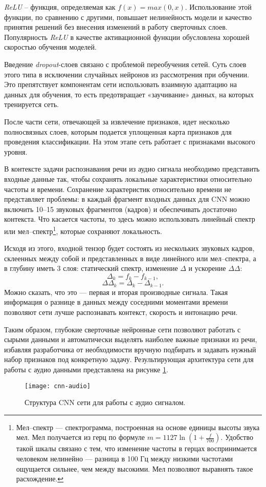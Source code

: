 \emph{ReLU} – функция, определяемая как $f(x)=max(0, x)$. Использование этой функции, по сравнению с другими, повышает нелинейность модели и качество принятия решений без внесения изменений в работу сверточных слоев\cite[с.~3]{cnn-imagenet}. Популярность \emph{ReLU} в качестве активационной функции обусловлена хорошей скоростью обучения моделей.

Введение \emph{dropout}-слоев связано с проблемой переобучения сетей\cite{dnn-dropout}. Суть слоев этого типа в исключении случайных нейронов из рассмотрения при обучении. Это препятствует компонентам сети использовать взаимную адаптацию на данных для обучения, то есть предотвращает «заучивание» данных, на которых тренируется сеть.

После части сети, отвечающей за извлечение признаков, идет несколько полносвязных слоев, которым подается уплощенная карта признаков для проведения классификации. На этом этапе сеть работает с признаками высокого уровня.

В контексте задачи распознавания речи из аудио сигнала необходимо представить входные данные так, чтобы сохранять локальные характеристики относительно частоты и времени. Сохранение характеристик относительно времени не представляет проблемы: в каждый фрагмент входных данных для CNN можно включить 10--15 звуковых фрагментов (кадров) и обеспечивать достаточно контекста. Что касается частоты, то здесь можно использовать линейный спектр или мел--спектр\footnote{Мел--спектр --- спектрограмма, построенная на основе единицы высоты звука мел. Мел получается из герц по формуле $m = 1127 \ln \left(1 + \frac{f}{700}\right)$. Удобство такой шкалы связано с тем, что изменение частоты в герцах воспринимается человеком нелинейно --- разница в 100 Гц между низкими частотами ощущается сильнее, чем между высокими. Мел позволяют выравнять такое расхождение.}, которые сохраняют локальность.

Исходя из этого, входной тензор будет состоять из нескольких звуковых кадров, склеенных между собой и представленных в виде линейного или мел--спектра, а в глубину иметь 3 слоя: статический спектр, изменение $\Delta$ и ускорение $\Delta\Delta$:
$$\Delta_k = f_k - f_{k - 1},$$
$$\Delta\Delta_k = \Delta_k - \Delta_{k - 1}.$$
Можно сказать, что это --- первая и вторая производные сигнала. Такая информация о разнице в данных между соседними моментами времени позволяют сети лучше распознавать контекст, скорость и интонацию речи.

Таким образом, глубокие сверточные нейронные сети позволяют работать с сырыми данными и автоматически выделять наиболее важные признаки из речи, избавляя разработчика от необходимости вручную подбирать и задавать нужный набор признаков под конкретную задачу. Результирующая архитектура сети для работы с аудио данными представлена на рисунке \ref{fig:cnn-audio}.
\begin{figure}[h]
	\centering
	\texttt{[image: cnn-audio]}
	\caption{Структура CNN сети для работы с аудио сигналом.}
	\label{fig:cnn-audio}
\end{figure}

